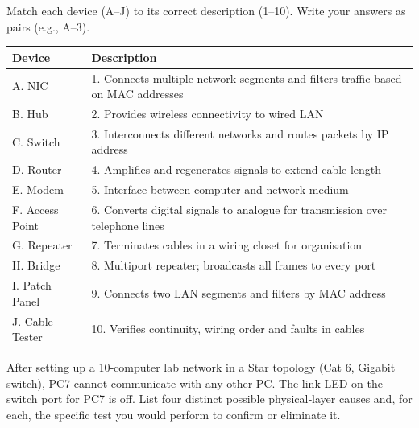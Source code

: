 \documentclass[11pt]{article}
\newcounter{popsec}
\newcounter{popsub}
\newcommand{\courssub}[1]{%
  \stepcounter{popsub}%
  \par\vspace{9pt}\noindent{\popxbold\fontsize{11.5}{13}\selectfont\color{popink}{\color{poporange}\thepopsec.\thepopsub}\hspace{6pt}#1}\par\nopagebreak\vspace{4pt}
}
\begin{document}
\begin{exercice}
Match each device (A–J) to its correct description (1–10). Write your answers as pairs (e.g., A–3).
\begin{center}
\begin{tabularx}{\linewidth}{|l|X|}\hline
\textbf{Device} & \textbf{Description} \\ \hline
A. NIC & 1. Connects multiple network segments and filters traffic based on MAC addresses \\ \hline
B. Hub & 2. Provides wireless connectivity to wired LAN \\ \hline
C. Switch & 3. Interconnects different networks and routes packets by IP address \\ \hline
D. Router & 4. Amplifies and regenerates signals to extend cable length \\ \hline
E. Modem & 5. Interface between computer and network medium \\ \hline
F. Access Point & 6. Converts digital signals to analogue for transmission over telephone lines \\ \hline
G. Repeater & 7. Terminates cables in a wiring closet for organisation \\ \hline
H. Bridge & 8. Multiport repeater; broadcasts all frames to every port \\ \hline
I. Patch Panel & 9. Connects two LAN segments and filters by MAC address \\ \hline
J. Cable Tester & 10. Verifies continuity, wiring order and faults in cables \\ \hline
\end{tabularx}
\end{center}
\end{exercice}

\begin{exercice}
After setting up a 10‑computer lab network in a Star topology (Cat 6, Gigabit switch), PC7 cannot communicate with any other PC. The link LED on the switch port for PC7 is off. List four distinct possible physical‑layer causes and, for each, the specific test you would perform to confirm or eliminate it.
\end{exercice}

\courssub{I prepare for the GCE}
\end{document}

